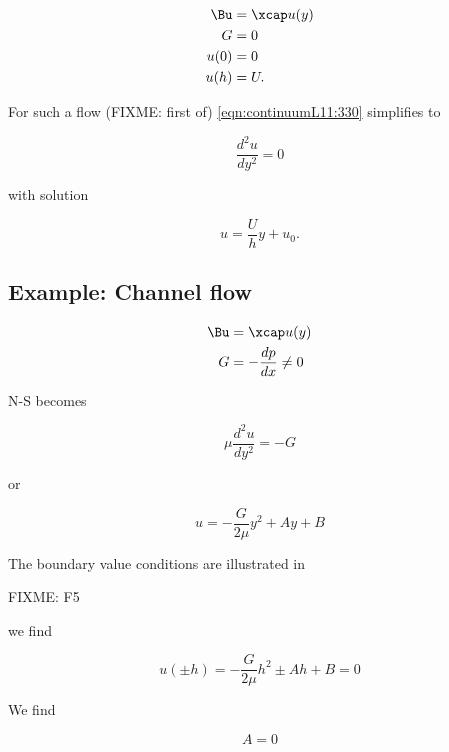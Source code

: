 \begin{align}\label{eqn:continuumL11:490}
\Bu &= \xcap u(y) \\
G &= 0 \\
u(0) &= 0 \\
u(h) &= U.
\end{align}

For such a flow (FIXME: first of) \ref{eqn:continuumL11:330} simplifies to

\begin{equation}\label{eqn:continuumL11:530}
\frac{d^2 u}{dy^2} = 0
\end{equation}

with solution

\begin{equation}\label{eqn:continuumL11:550}
u = \frac{U}{h} y + u_0.
\end{equation}


\subsection{Example: Channel flow}

\begin{align}\label{eqn:continuumL11:570}
\Bu &= \xcap u(y) \\
G &= - \frac{dp}{dx} \ne 0
\end{align}

N-S becomes

\begin{equation}\label{eqn:continuumL11:590}
\mu \frac{d^2 u}{dy^2} = -G
\end{equation}

or

\begin{equation}\label{eqn:continuumL11:610}
u = -\frac{G}{2 \mu} y^2 + A y + B
\end{equation}

The boundary value conditions are illustrated in

FIXME: F5

we find

\begin{equation}\label{eqn:continuumL11:630}
u(\pm h) = 
-\frac{G}{2 \mu} h^2 \pm A h + B = 0
\end{equation}

We find

\begin{equation}\label{eqn:continuumL11:650}
A = 0
\end{equation}

